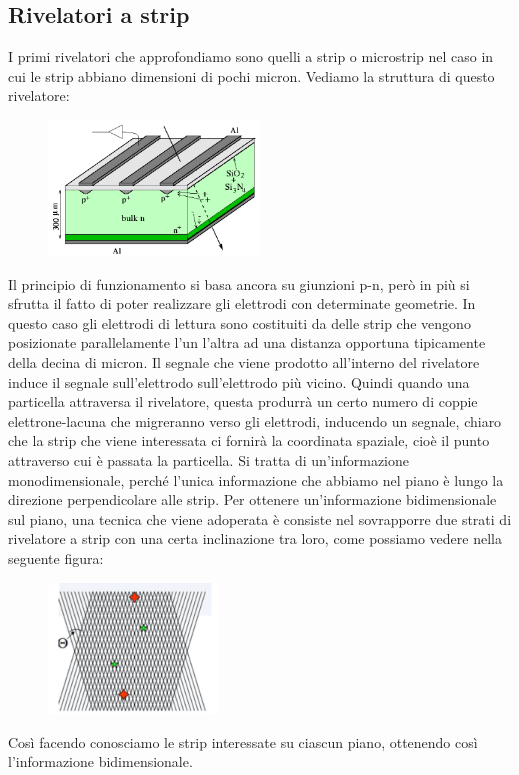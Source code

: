 \subsection{Rivelatori a strip}
I primi rivelatori che approfondiamo sono quelli a strip o microstrip nel caso in cui le strip abbiano dimensioni di pochi micron. Vediamo la struttura di questo rivelatore:
\begin{figure}[H]
   \centering
   \includegraphics[width=0.5\textwidth]{immagini/rivelatori_a_strip.png}
\end{figure}
Il principio di funzionamento si basa ancora su giunzioni p-n, però in più si sfrutta il fatto di poter realizzare gli elettrodi con determinate geometrie. In questo caso gli elettrodi di lettura sono costituiti da delle strip che vengono posizionate parallelamente l'un l'altra ad una distanza opportuna tipicamente della decina di micron. Il segnale che viene prodotto all'interno del rivelatore induce il segnale sull'elettrodo sull'elettrodo più vicino. Quindi quando una particella attraversa il rivelatore, questa produrrà un certo numero di coppie elettrone-lacuna che migreranno verso gli elettrodi, inducendo un segnale, \E chiaro che la strip che viene interessata ci fornirà la coordinata spaziale, cioè il punto attraverso cui è passata la particella. Si tratta di un'informazione monodimensionale, perché l'unica informazione che abbiamo nel piano è lungo la direzione perpendicolare alle strip. Per ottenere un'informazione bidimensionale sul piano, una tecnica che viene adoperata è consiste nel sovrapporre due strati di rivelatore a strip con una certa inclinazione tra loro, come possiamo vedere nella seguente figura:
\begin{figure}[H]
   \centering
   \includegraphics[width=0.4\textwidth]{immagini/angolo_rivelatore_a_strip.png}
\end{figure}
Così facendo conosciamo le strip interessate su ciascun piano, ottenendo così l'informazione bidimensionale.


